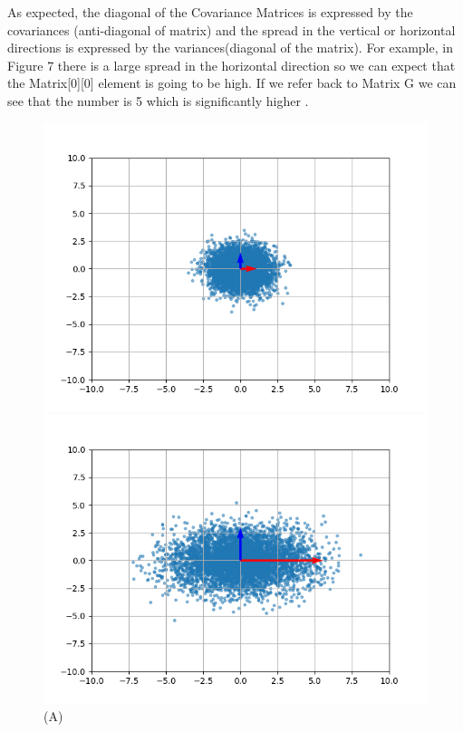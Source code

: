 \documentclass{article}
\begin{document}
\pagebreak
\begin{flushleft}
As expected, the diagonal of the Covariance Matrices is expressed by the covariances (anti-diagonal of matrix) and the spread in the vertical or horizontal directions is expressed by the variances(diagonal of the matrix).\break
\break
For example, in Figure 7 there is a large spread in the horizontal direction so we can expect that the Matrix[0][0] element is going to be high. If we refer back to Matrix G we can see that the number is 5 which is significantly higher .
\end{flushleft}
\begin{figure}[!htb]
        \centering
        \begin{minipage}{0.24\textwidth}
                \centering
                \includegraphics[width=1\linewidth]{../Cov_0.png}
                \caption{(A)}
        \end{minipage}\hfill
        \begin{minipage}{0.24\textwidth}
                \centering
                \includegraphics[width=1\linewidth]{../Cov_1.png}

\end{minipage}
\end{figure}
\end{document}
